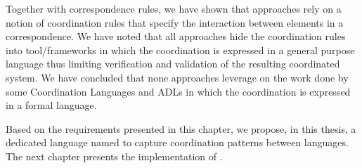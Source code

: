 Together with correspondence rules, we have shown that approaches rely on a notion of coordination rules that specify the interaction between elements in a correspondence. We have noted that all approaches hide the coordination rules into tool/frameworks in which the coordination is expressed in a general purpose language thus limiting verification and validation of the resulting coordinated system. We have concluded that none approaches leverage on the work done by some Coordination Languages and ADLs in which the coordination is expressed in a formal language.  

Based on the requirements presented in this chapter, we propose, in this thesis, a dedicated language named \bcool to capture coordination patterns between languages. The next chapter presents the implementation of \bcool.




